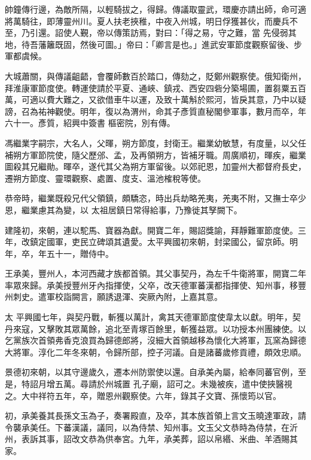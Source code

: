 \begin{pinyinscope}
 帥鐘傳行邊，為敵所隔，以輕騎拔之，得歸。傳議取靈武，環慶亦請出師，命可適將萬騎往，即薄靈州川。夏人扶老挾稚，中夜入州城，明日俘獲甚伙，而慶兵不至，乃引還。詔使人覲，帝以傳策訪焉，對曰：「得之易，守之難，當
 先侵弱其地，待吾藩籬既固，然後可圖。」帝曰：「卿言是也。」進武安軍節度觀察留後、步軍都虞候。



 大城蕭關，與傳議齟齬，會覆師數百於踏口，傳劾之，貶鄭州觀察使。俄知衛州，拜淮康軍節度使。轉運使請於平夏、通峽、鎮戎、西安四砦分築場圃，置芻粟五百萬，可適以費大難之，又欲借車牛以運，及致十萬斛於熙河，皆戾其意，乃中以疑謗，召為祐神觀使。明年，復以為渭州，命其子彥質直秘閣參軍事，數月而卒，年六十一。彥質，紹興中簽書
 樞密院，別有傳。



 馮繼業字嗣宗，大名人，父暉，朔方節度，封衛王。繼業幼敏慧，有度量，以父任補朔方軍節院使，隨父歷邠、孟，及再領朔方，皆補牙職。周廣順初，暉疾，繼業圖殺其兄繼勛。暉卒，遂代其父為朔方軍留後。以郊祀恩，加靈州大都督府長史，遷朔方節度、靈環觀察、處置、度支、溫池榷稅等使。



 恭帝時，繼業既殺兄代父領鎮，頗驕恣，時出兵劫略羌夷，羌夷不附，又撫士卒少恩，繼業慮其為變，以
 太祖居鎮日常得給事，乃豫徙其孥闕下。



 建隆初，來朝，連以駝馬、寶器為獻。開寶二年，賜詔獎諭，拜靜難軍節度使。三年，改鎮定國軍，吏民立碑頌其遺愛。太平興國初來朝，封梁國公，留京師。明年，卒，年五十一，贈侍中。



 王承美，豐州人，本河西藏才族都首領。其父事契丹，為左千牛衛將軍，開寶二年率眾來歸。承美授豐州牙內指揮使，父卒，改天德軍蕃漢都指揮使、知州事，移豐州刺史。遣軍校詣闕言，願誘退渾、突厥內附，上嘉其意。



 太
 平興國七年，與契丹戰，斬獲以萬計，禽其天德軍節度使韋太以獻。明年，契丹來寇，又擊敗其眾萬餘，追北至青塚百餘里，斬獲益眾。以功授本州團練使。以乞黨族次首領弗香克浪買為歸德郎將，沒細大首領越移為懷化大將軍，瓦窯為歸德大將軍。淳化二年冬來朝，令歸所部，控子河議。自是諸蕃歲修貢禮，頗效忠順。



 景德初來朝，以其守邊歲久，遷本州防禦使以還。自承美內屬，給奉同蕃官例，至是，特詔月增五萬。尋請於州城置
 孔子廟，詔可之。未幾被疾，遣中使挾醫視之。大中祥符五年，卒，贈恩州觀察使。六年，錄其子文寶、孫懷筠以官。



 初，承美養其長孫文玉為子，奏署殿直，及卒，其本族首領上言文玉曉達軍政，請令襲承美任。下蕃漢議，議同，以為侍禁、知州事。文玉父文恭時為侍禁，在沂州，表訴其事，詔改文恭為供奉宮。九年，承美葬，詔以帛緡、米曲、羊酒賜其家。




\end{pinyinscope}
